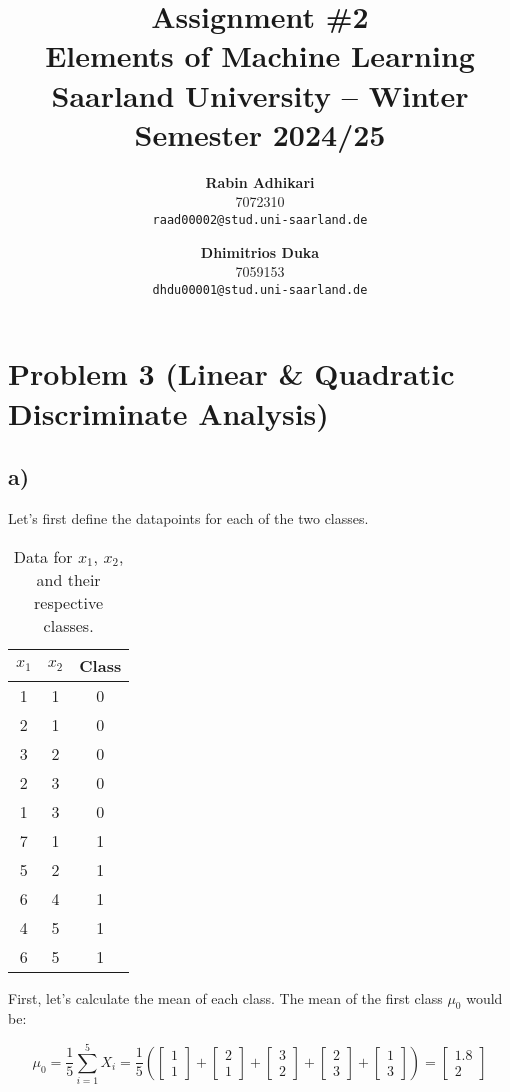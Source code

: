 \documentclass{article}
\title{Assignment \#2\\
  \vspace{2mm}
  \small{Elements of Machine Learning}
  \\
  \vspace{2mm}
  \small{Saarland University -- Winter Semester 2024/25}
}
\author{%
\textbf{Rabin Adhikari} \\
  7072310 \\
  \texttt{raad00002@stud.uni-saarland.de} \\
  \and
  \textbf{Dhimitrios Duka} \\
 7059153 \\
  \texttt{dhdu00001@stud.uni-saarland.de} \\
}
\begin{document}
\maketitle

\section*{Problem 3 (Linear \& Quadratic Discriminate Analysis)}
\subsection{a)} Let's first define the datapoints for each of the two classes.

\begin{table}[h!]
  \centering
  \caption{
    Data for \(x_1\), \(x_2\), and their respective classes.
  }
  \begin{tabular}{ccc}
    \toprule
    \textbf{\(x_1\)} & \textbf{\(x_2\)} & \textbf{Class} \\
    \midrule
    1 & 1 & 0 \\
    2 & 1 & 0 \\
    3 & 2 & 0 \\
    2 & 3 & 0 \\
    1 & 3 & 0 \\
    \midrule
    7 & 1 & 1 \\
    5 & 2 & 1 \\
    6 & 4 & 1 \\
    4 & 5 & 1 \\
    6 & 5 & 1 \\
    \bottomrule
  \end{tabular}
  \label{tab:x1_x2_classes}
\end{table}

First, let's calculate the mean of each class. The mean of the first class $\mu_0$ would be:

\begin{equation}
  \mu_0 = \frac{1}{5} \sum_{i=1}^{5} X_i = \frac{1}{5} \left( \begin{bmatrix} 1 \\ 1 \end{bmatrix} + \begin{bmatrix} 2 \\ 1 \end{bmatrix} + \begin{bmatrix} 3 \\ 2 \end{bmatrix} + \begin{bmatrix} 2 \\ 3 \end{bmatrix} + \begin{bmatrix} 1 \\ 3 \end{bmatrix} \right) = \begin{bmatrix} 1.8 \\ 2 \end{bmatrix}
\end{equation}
\end{document}
